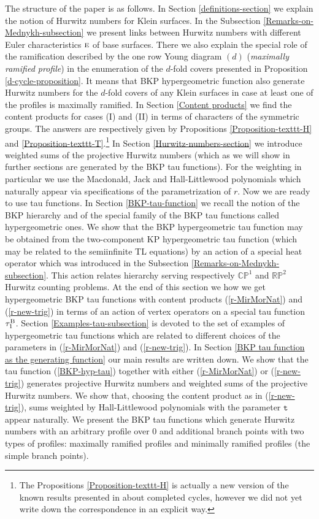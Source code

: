 \documentclass[a4paper,10pt]{article}
\theoremstyle{plain}
\theoremstyle{remark}
\begin{document}
The structure of the paper is as follows. In Section \ref{definitions-section} we explain the notion of Hurwitz numbers for
Klein surfaces. In the Subsection \ref{Remarks-on-Mednykh-subsection} we present links between Hurwitz numbers with different Euler characteristics
$\textsc{e}$ of base surfaces. There we also explain the special role of the ramification described by the one row Young diagram
$(d)$ (\textit{maximally ramified profile}) in the enumeration
of the $d$-fold covers presented in Proposition \ref{d-cycle-proposition}. It means that BKP hypergeometric function
also generate Hurwitz numbers for the $d$-fold covers of any Klein surfaces in case at least one of the profiles is
maximally ramified.
In Section \ref{Content products} we find the content products for cases
(I) and (II) in terms of characters of the symmetric groups. The answers are respectively given by Propositions \ref{Proposition-texttt-H}
and \ref{Proposition-texttt-T}.\footnote{The Propositions \ref{Proposition-texttt-H} is actually a new version of the known
results
presented in \cite{AMMN-2011} about completed cycles, however we did not yet write down the correspondence in an explicit way.}
In Section \ref{Hurwitz-numbers-section} we introduce weighted sums of
the projective Hurwitz numbers (which as we will show in further sections are generated by the BKP tau functions). For the weighting
in particular
we use the Macdonald, Jack and Hall-Littlewood polynomials which
naturally appear via specifications of the parametrization of $r$. Now we are ready to use tau functions.
In Section \ref{BKP-tau-function} we recall the notion of the BKP hierarchy and of the special family of the BKP tau functions
called hypergeometric ones. We show that the BKP hypergeometric tau function may be obtained from the two-component KP hypergeometric
tau function (which may be related to the semiinfinite TL equations) by an action of a special heat operator which was introduced in
the Subsection \ref{Remarks-on-Mednykh-subsection}. This action
relates hierarchy serving respectively $\mathbb{CP}^1$ and $\mathbb{RP}^2$ Hurwitz counting problems.
At the end of this section we how we get hypergeometric BKP tau functions with content products (\ref{r-MirMorNat}) and
(\ref{r-new-trig}) in terms of an
action of vertex operators on a special tau function $\tau^{\rm B}_1$.
Section \ref{Examples-tau-subsection} is devoted to the set of examples of hypergeometric tau functions which are related to
different choices of the parameters in (\ref{r-MirMorNat}) and (\ref{r-new-trig}).
In Section \ref{BKP tau function as the generating function} our main results are written down. We show that the
tau function (\ref{BKP-hyp-tau}) together with either (\ref{r-MirMorNat}) or (\ref{r-new-trig}) generates projective Hurwitz numbers and
weighted sums of the projective Hurwitz numbers. We show that, choosing the content product as in
(\ref{r-new-trig}), sums weighted by Hall-Littlewood polynomials with the parameter $\texttt{t}$ appear naturally.
We present the BKP tau functions which generate Hurwitz numbers with an arbitrary profile over $0$ and additional
branch points with two types of profiles: maximally ramified profiles and minimally ramified profiles (the simple branch points).
\end{document}
